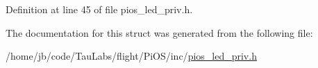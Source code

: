 \-Definition at line 45 of file pios\-\_\-led\-\_\-priv.\-h.



\-The documentation for this struct was generated from the following file\-:\begin{DoxyCompactItemize}
\item 
/home/jb/code/\-Tau\-Labs/flight/\-Pi\-O\-S/inc/\hyperlink{pios__led__priv_8h}{pios\-\_\-led\-\_\-priv.\-h}\end{DoxyCompactItemize}

